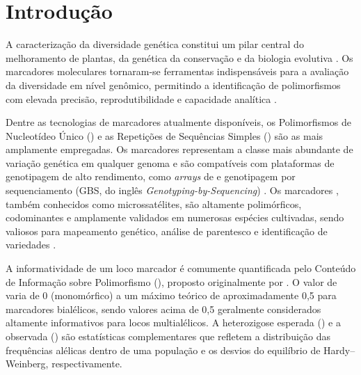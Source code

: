 
\section{Introdução}
\label{sec:intro}

A caracterização da diversidade genética constitui um pilar central do
melhoramento de plantas, da genética da conservação e da biologia
evolutiva \autocite{Hamrick1989}. Os marcadores moleculares tornaram-se
ferramentas indispensáveis para a avaliação da diversidade em nível
genômico, permitindo a identificação de polimorfismos com elevada
precisão, reprodutibilidade e capacidade analítica
\autocite{Semagn2006}.

Dentre as tecnologias de marcadores atualmente disponíveis, os
Polimorfismos de Nucleotídeo Único (\snp{}) e as Repetições de
Sequências Simples (\ssr{}) são as mais amplamente empregadas. Os
marcadores \snp{} representam a classe mais abundante de variação
genética em qualquer genoma e são compatíveis com plataformas de
genotipagem de alto rendimento, como \textit{arrays} de \snp{} e
genotipagem por sequenciamento (GBS, do inglês
\textit{Genotyping-by-Sequencing}) \autocite{Elshire2011}. Os marcadores
\ssr{}, também conhecidos como microssatélites, são altamente
polimórficos, codominantes e amplamente validados em numerosas espécies
cultivadas, sendo valiosos para mapeamento genético, análise de
parentesco e identificação de variedades \autocite{Powell1996}.

A informatividade de um loco marcador é comumente quantificada pelo
Conteúdo de Informação sobre Polimorfismo (\pic{}), proposto
originalmente por \textcite{Botstein1980}. O valor de \pic{} varia de 0
(monomórfico) a um máximo teórico de aproximadamente 0,5 para marcadores
bialélicos, sendo valores acima de 0,5 geralmente considerados
altamente informativos para locos multialélicos. A heterozigose esperada
(\he{}) e a observada (\ho{}) são estatísticas complementares que
refletem a distribuição das frequências alélicas dentro de uma população
e os desvios do equilíbrio de Hardy--Weinberg, respectivamente.

